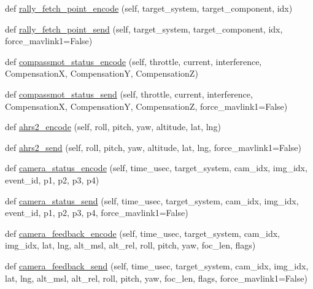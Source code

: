 \begin{DoxyCompactItemize}
\item 
def \hyperlink{classpymavlink_1_1dialects_1_1v10_1_1MAVLink_a828fdb86aff28a72c260cfb872e81877}{rally\+\_\+fetch\+\_\+point\+\_\+encode} (self, target\+\_\+system, target\+\_\+component, idx)
\item 
def \hyperlink{classpymavlink_1_1dialects_1_1v10_1_1MAVLink_af21c36bfa469654c60cb125c27fd54a4}{rally\+\_\+fetch\+\_\+point\+\_\+send} (self, target\+\_\+system, target\+\_\+component, idx, force\+\_\+mavlink1=False)
\item 
def \hyperlink{classpymavlink_1_1dialects_1_1v10_1_1MAVLink_ac074be31dc0b284a7f109ad5f428b8c4}{compassmot\+\_\+status\+\_\+encode} (self, throttle, current, interference, CompensationX, CompensationY, CompensationZ)
\item 
def \hyperlink{classpymavlink_1_1dialects_1_1v10_1_1MAVLink_a7b6e059ace9b1c72fdd1438b735e98a9}{compassmot\+\_\+status\+\_\+send} (self, throttle, current, interference, CompensationX, CompensationY, CompensationZ, force\+\_\+mavlink1=False)
\item 
def \hyperlink{classpymavlink_1_1dialects_1_1v10_1_1MAVLink_ae5cd56ad2d47ba9a811c3b4eaac392b2}{ahrs2\+\_\+encode} (self, roll, pitch, yaw, altitude, lat, lng)
\item 
def \hyperlink{classpymavlink_1_1dialects_1_1v10_1_1MAVLink_a1dab3c7a9295dba93d628b20729f9187}{ahrs2\+\_\+send} (self, roll, pitch, yaw, altitude, lat, lng, force\+\_\+mavlink1=False)
\item 
def \hyperlink{classpymavlink_1_1dialects_1_1v10_1_1MAVLink_a584d2dd9e921bb5e76ce62b7a88c62f7}{camera\+\_\+status\+\_\+encode} (self, time\+\_\+usec, target\+\_\+system, cam\+\_\+idx, img\+\_\+idx, event\+\_\+id, p1, p2, p3, p4)
\item 
def \hyperlink{classpymavlink_1_1dialects_1_1v10_1_1MAVLink_a26f5b8a5517f932a4c4329b22b2ec905}{camera\+\_\+status\+\_\+send} (self, time\+\_\+usec, target\+\_\+system, cam\+\_\+idx, img\+\_\+idx, event\+\_\+id, p1, p2, p3, p4, force\+\_\+mavlink1=False)
\item 
def \hyperlink{classpymavlink_1_1dialects_1_1v10_1_1MAVLink_a3fb4c2b7eeef3301af15e4b3c0106764}{camera\+\_\+feedback\+\_\+encode} (self, time\+\_\+usec, target\+\_\+system, cam\+\_\+idx, img\+\_\+idx, lat, lng, alt\+\_\+msl, alt\+\_\+rel, roll, pitch, yaw, foc\+\_\+len, flags)
\item 
def \hyperlink{classpymavlink_1_1dialects_1_1v10_1_1MAVLink_a6c15c976377eac183efcaf7034a28161}{camera\+\_\+feedback\+\_\+send} (self, time\+\_\+usec, target\+\_\+system, cam\+\_\+idx, img\+\_\+idx, lat, lng, alt\+\_\+msl, alt\+\_\+rel, roll, pitch, yaw, foc\+\_\+len, flags, force\+\_\+mavlink1=False)

\end{DoxyCompactItemize}
